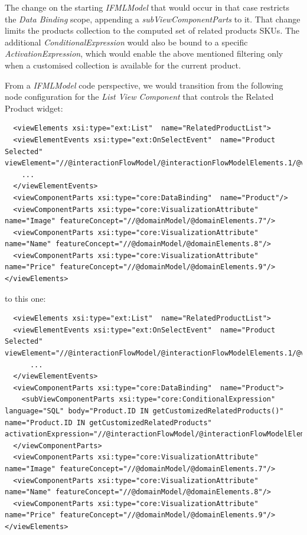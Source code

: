 The change on the starting \textit{IFMLModel} that would occur in that case restricts the \textit{Data Binding} scope, appending a \textit{subViewComponentParts} to it. That change limits the products collection to the computed set of related products SKUs. The additional \textit{ConditionalExpression} would also be bound to a specific \textit{ActivationExpression}, which would enable the above mentioned filtering only when a customised collection is available for the current product. 

From a \textit{IFMLModel} code perspective, we would transition from the following node configuration for the \textit{List View Component} that controls the Related Product widget:

\vspace{0.5cm}
\lstset{language=XML}
\begin{lstlisting} 
  <viewElements xsi:type="ext:List"  name="RelatedProductList">
  <viewElementEvents xsi:type="ext:OnSelectEvent"  name="Product Selected" viewElement="//@interactionFlowModel/@interactionFlowModelElements.1/@viewElements.2">
    ...
  </viewElementEvents>
  <viewComponentParts xsi:type="core:DataBinding"  name="Product"/>
  <viewComponentParts xsi:type="core:VisualizationAttribute"  name="Image" featureConcept="//@domainModel/@domainElements.7"/>
  <viewComponentParts xsi:type="core:VisualizationAttribute"  name="Name" featureConcept="//@domainModel/@domainElements.8"/>
  <viewComponentParts xsi:type="core:VisualizationAttribute"  name="Price" featureConcept="//@domainModel/@domainElements.9"/>
</viewElements>
\end{lstlisting}
\vspace{0.5cm}

\newpage
to this one:

\vspace{0.5cm}
\lstset{language=XML}
\begin{lstlisting} 
  <viewElements xsi:type="ext:List"  name="RelatedProductList">
  <viewElementEvents xsi:type="ext:OnSelectEvent"  name="Product Selected" viewElement="//@interactionFlowModel/@interactionFlowModelElements.1/@viewElements.2">
      ...
  </viewElementEvents>
  <viewComponentParts xsi:type="core:DataBinding"  name="Product">
    <subViewComponentParts xsi:type="core:ConditionalExpression"  language="SQL" body="Product.ID IN getCustomizedRelatedProducts()" name="Product.ID IN getCustomizedRelatedProducts" activationExpression="//@interactionFlowModel/@interactionFlowModelElements.17"/>
  </viewComponentParts>
  <viewComponentParts xsi:type="core:VisualizationAttribute"  name="Image" featureConcept="//@domainModel/@domainElements.7"/>
  <viewComponentParts xsi:type="core:VisualizationAttribute"  name="Name" featureConcept="//@domainModel/@domainElements.8"/>
  <viewComponentParts xsi:type="core:VisualizationAttribute"  name="Price" featureConcept="//@domainModel/@domainElements.9"/>
</viewElements>
\end{lstlisting}
\vspace{0.5cm}

